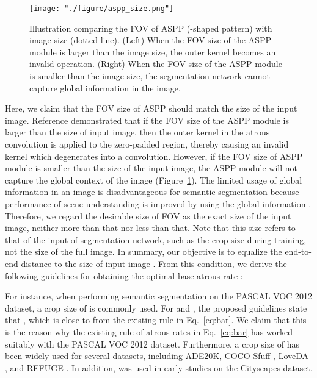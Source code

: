 \documentclass{article}
\def\figref#1{Figure~\ref{#1}}
\def\eqref#1{Eq.~\ref{#1}}
\begin{document}
\begin{figure}[t!]
	\centering
	\texttt{[image: "./figure/aspp\_size.png"]}
	\caption{Illustration comparing the FOV of ASPP (\EightStarTaper-shaped pattern) with image size (dotted line). (Left) When the FOV size of the ASPP module is larger than the image size, the outer kernel becomes an invalid operation. (Right) When the FOV size of the ASPP module is smaller than the image size, the segmentation network cannot capture global information in the image.}
	\label{fig:asppsize}
\end{figure}

Here, we claim that the FOV size of ASPP should match the size of the input image. Reference \citep{DBLP:journals/corr/ChenPSA17} demonstrated that if the FOV size of the ASPP module is larger than the size of input image, then the outer kernel in the  atrous convolution is applied to the zero-padded region, thereby causing an invalid kernel which degenerates into a  convolution. However, if the FOV size of ASPP module is smaller than the size of the input image, the ASPP module will not capture the global context of the image (\figref{fig:asppsize}). The limited usage of global information in an image is disadvantageous for semantic segmentation because performance of scene understanding is improved by using the global information \citep{DBLP:conf/cvpr/YangYZLY18}. Therefore, we regard the desirable size of FOV as the exact size of the input image, neither more than that nor less than that. Note that this size refers to that of the input of segmentation network, such as the crop size during training, not the size of the full image. In summary, our objective is to equalize the end-to-end distance  to the size of input image . From this condition, we derive the following guidelines for obtaining the optimal base atrous rate :


For instance, when performing semantic segmentation on the PASCAL VOC 2012 dataset, a crop size of  is commonly used. For  and , the proposed guidelines state that , which is close to  from the existing rule in \eqref{eq:bar}. We claim that this is the reason why the existing rule of atrous rates in \eqref{eq:bar} has worked suitably with the PASCAL VOC 2012 dataset. Furthermore, a crop size of  has been widely used for several datasets, including ADE20K, COCO Sfuff \citep{DBLP:conf/cvpr/CaesarUF18}, LoveDA \citep{DBLP:conf/nips/WangZMLZ21}, and REFUGE \citep{DBLP:journals/mia/OrlandoFBKBDFHK20}. In addition,  was used in early studies on the Cityscapes dataset.
\end{document}
